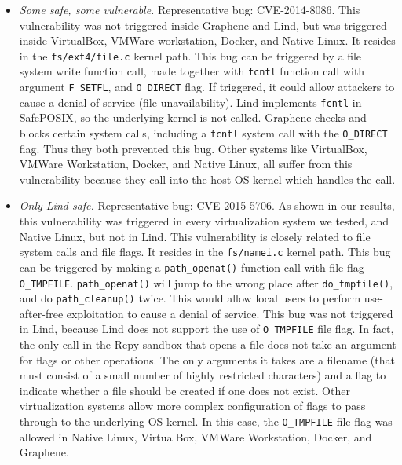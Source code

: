 {{\begin{itemize}
\item \emph{Some safe, some vulnerable.}  Representative bug: CVE-2014-8086.
This vulnerability was not triggered inside Graphene and Lind, but was triggered inside
VirtualBox, VMWare workstation, Docker, and Native Linux. It resides in the \texttt{fs/ext4/file.c} kernel path.
This bug can be triggered by a file system write function call, made together with \texttt{fcntl} function call
with argument \texttt{F\_SETFL}, and \texttt{O\_DIRECT} flag. If triggered, it could allow attackers to cause
a denial of service (file unavailability). Lind implements \texttt{fcntl}
in SafePOSIX, so the underlying kernel is not called.
Graphene checks and blocks certain system calls, including
a \texttt{fcntl} system call with the \texttt{O\_DIRECT} flag.
Thus they both prevented this bug. Other systems like VirtualBox, VMWare Workstation, Docker, and Native Linux,
all suffer from this vulnerability because they call into the host OS
kernel which handles the call.

\item \emph{Only Lind safe.}  Representative bug: CVE-2015-5706. As
shown in our results, this vulnerability was triggered in every
virtualization system we tested, and Native Linux, but not in Lind. This vulnerability
is closely related to file system calls and file flags. It resides in the \texttt{fs/namei.c}
kernel path. This bug can be triggered by making a \texttt{path\_openat()} function
call with file flag \texttt{O\_TMPFILE}. \texttt{path\_openat()} will jump to the wrong
place after \texttt{do\_tmpfile()}, and do \texttt{path\_cleanup()} twice. This would
allow local users to perform use-after-free exploitation to cause a denial of service.
This bug was not triggered in Lind, because Lind does not support the use of
\texttt{O\_TMPFILE} file flag. In fact, the only call in the Repy sandbox that
opens a file does not take an argument for flags or other operations.  The
only arguments it takes are a filename (that must consist of a small number
of highly restricted characters) and a flag to indicate whether a file should
be created if one does not exist.
Other virtualization systems allow more complex configuration of flags to
pass through to the underlying OS kernel. 
In this case, the \texttt{O\_TMPFILE} file flag was
allowed in Native Linux, VirtualBox, VMWare Workstation, Docker, and Graphene.


\end{itemize}}}
